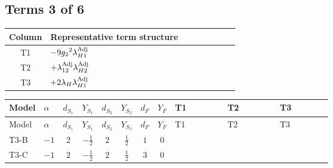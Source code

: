 \documentclass[8pt]{article}
\begin{document}
\begin{landscape}
\subsection*{Terms 3 of 6}
\begin{center}
\begin{tabular}{@{}c >{\raggedright\arraybackslash}p{0.82\linewidth}@{}}
\toprule
Column & Representative term structure \\
\midrule
T1 & \(\displaystyle -9 {g_2}^2 {\lambda_{H1}^{\rm Adj}}\) \\
\midrule
T2 & \(\displaystyle +{\lambda_{12}^{\rm Adj}} {\lambda_{H2}^{\rm Adj}}\) \\
\midrule
T3 & \(\displaystyle +2 {\lambda_H} {\lambda_{H1}^{\rm Adj}}\) \\
\midrule
\bottomrule
\end{tabular}
\end{center}
\smallskip
\tiny
\begin{longtable}{@{}llcccccc >{\raggedright\arraybackslash}p{0.21\linewidth} >{\raggedright\arraybackslash}p{0.21\linewidth} >{\raggedright\arraybackslash}p{0.21\linewidth}@{}}
\toprule
Model & $\alpha$ & $d_{S_1}$ & $Y_{S_1}$ & $d_{S_2}$ & $Y_{S_2}$ & $d_F$ & $Y_F$ & T1 & T2 & T3 \\
\midrule
\endfirsthead
\toprule
Model & $\alpha$ & $d_{S_1}$ & $Y_{S_1}$ & $d_{S_2}$ & $Y_{S_2}$ & $d_F$ & $Y_F$ & T1 & T2 & T3 \\
\midrule
\endhead
T3-B & $-1$ & $2$ & $-\frac{1}{2}$ & $2$ & $\frac{1}{2}$ & $1$ & $0$ & \scriptsize\adjustbox{max width=\linewidth}{$\begin{gathered} -9 {g_2}^2 {\lambda_{H1}^{\rm Adj}}\end{gathered}$} & \scriptsize\adjustbox{max width=\linewidth}{$\begin{gathered} +{\lambda_{12}^{\rm Adj}} {\lambda_{H2}^{\rm Adj}}\end{gathered}$} & \scriptsize\adjustbox{max width=\linewidth}{$\begin{gathered} +2 {\lambda_H} {\lambda_{H1}^{\rm Adj}}\end{gathered}$} \\
\midrule
T3-C & $-1$ & $2$ & $-\frac{1}{2}$ & $2$ & $\frac{1}{2}$ & $3$ & $0$ & \scriptsize\adjustbox{max width=\linewidth}{$\begin{gathered} -9 {g_2}^2 {\lambda_{H1}^{\rm Adj}}\end{gathered}$} & \scriptsize\adjustbox{max width=\linewidth}{$\begin{gathered} +{\lambda_{12}^{\rm Adj}} {\lambda_{H2}^{\rm Adj}}\end{gathered}$} & \scriptsize\adjustbox{max width=\linewidth}{$\begin{gathered} +2 {\lambda_H} {\lambda_{H1}^{\rm Adj}}\end{gathered}$} \\

\end{longtable}
\end{landscape}
\end{document}
